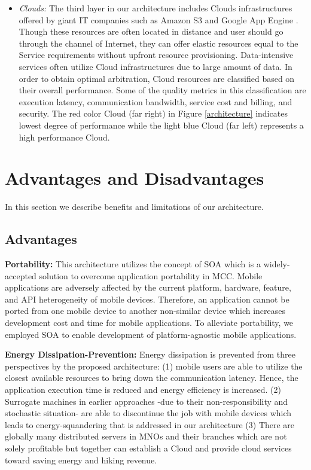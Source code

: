 \documentclass[conference]{IEEEtran}
\begin{document}
\begin{itemize}
\item{\textit{Clouds:}}
The third layer in our architecture includes Clouds infrastructures offered by giant IT companies such as Amazon S3 \cite{amazon} and Google App Engine \cite{googleappengine}. Though these resources are often located in distance and user should go through the channel of Internet, they can offer elastic resources equal to the Service requirements without upfront resource provisioning. Data-intensive services often utilize Cloud infrastructures due to large amount of data. In order to obtain optimal arbitration, Cloud resources are classified based on their overall performance. Some of the quality metrics in this classification are execution latency, communication bandwidth, service cost and billing, and security. The red color Cloud (far right) in Figure \ref{architecture} indicates lowest degree of performance while the light blue Cloud (far left) represents a high performance Cloud.
\end{itemize}

\section{Advantages and Disadvantages}
In this section we describe benefits and limitations of our architecture.
\subsection{Advantages}
\textbf{Portability:} This architecture utilizes the concept of SOA which is a widely-accepted solution to overcome application portability in MCC. Mobile applications are adversely affected by the current platform, hardware, feature, and API heterogeneity of mobile devices. Therefore, an application cannot be ported from one mobile device to another non-similar device which increases development cost and time for mobile applications. To alleviate portability, we employed SOA to enable development of platform-agnostic mobile applications. 

\textbf{Energy Dissipation-Prevention:} Energy dissipation is prevented from three perspectives by the proposed architecture: (1) mobile users are able to utilize the closest available resources to bring down the communication latency. Hence, the application execution time is reduced and energy efficiency is increased. (2) Surrogate machines in earlier approaches -due to their non-responsibility and stochastic situation- are able to discontinue the job with mobile devices which leads to energy-squandering that is addressed in our architecture (3) There are globally many distributed servers in MNOs and their branches which are not solely profitable but together can establish a Cloud and provide cloud services toward saving energy and hiking revenue. 
\end{document}
